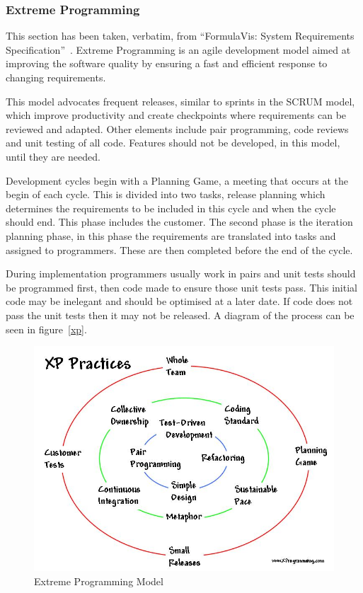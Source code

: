 \documentclass[11pt,a4paper]{article}
\begin{document}
\subsubsection{Extreme Programming}
This section has been taken, verbatim, from ``FormulaVis: System Requirements Specification''~\cite{formulaVis}. Extreme Programming is an agile development model aimed at improving the software quality by ensuring a fast and efficient response to changing requirements.

This model advocates frequent releases, similar to sprints in the SCRUM model, which improve productivity and create checkpoints where requirements can be reviewed and adapted. Other elements include pair programming, code reviews and unit testing of all code. Features should not be developed, in this model, until they are needed.

Development cycles begin with a Planning Game, a meeting that occurs at the begin of each cycle. This is divided into two tasks, release planning which determines the requirements to be included in this cycle and when the cycle should end. This phase includes the customer. The second phase is the iteration planning phase, in this phase the requirements are translated into tasks and assigned to programmers. These are then completed before the end of the cycle.

During implementation programmers usually work in pairs and unit tests should be programmed first, then code made to ensure those unit tests pass. This initial code may be inelegant and should be optimised at a later date. If code does not pass the unit tests
then it may not be released. A diagram of the process can be seen in figure~\ref{xp}.

\begin{figure}[H]
\centering
\includegraphics[width = 140mm]{circles.jpg}
\caption{Extreme Programming Model}
\label{fig:xp}
\end{figure}
\end{document}
